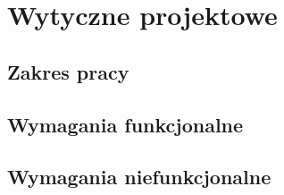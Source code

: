 \section{Wytyczne projektowe}

\subsection{Zakres pracy}

\subsection{Wymagania funkcjonalne}

\subsection{Wymagania niefunkcjonalne}

